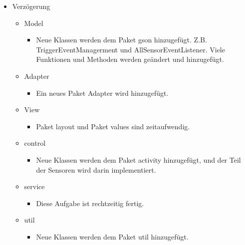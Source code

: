 \documentclass[a4paper]{scrreprt}
\begin{document}
        \begin{itemize}
         \item Verzögerung
                 \begin{itemize}
                    \item Model
                    \begin{itemize}
                        \item Neue Klassen werden dem Paket gson hinzugefügt. Z.B. TriggerEventManagerment und AllSensorEventListener. Viele Funktionen und Methoden werden geändert und hinzugefügt.
                     \end{itemize}
                  \end{itemize}
                  \begin{itemize}
                        \item Adapter
                            \begin{itemize}
                            \item Ein neues Paket Adapter wird hinzugefügt.
                            \end{itemize}
                  \end{itemize}
                  \begin{itemize}
                        \item View
                            \begin{itemize}
                            \item Paket layout und Paket values sind zeitaufwendig.
                            \end{itemize}
                  \end{itemize}
                   \begin{itemize}
                        \item control
                            \begin{itemize}
                            \item Neue Klassen werden dem Paket activity hinzugefügt, und der Teil der Sensoren wird darin implementiert.
                            \end{itemize}
                  \end{itemize}
                  \begin{itemize}
                        \item service
                            \begin{itemize}
                            \item  Diese Aufgabe ist rechtzeitig fertig.
                            \end{itemize}
                  \end{itemize}
                  \begin{itemize}
                        \item util
                            \begin{itemize}
                            \item Neue Klassen werden dem Paket util hinzugefügt.
                            \end{itemize}
                  \end{itemize}


\end{itemize}
\end{document}
